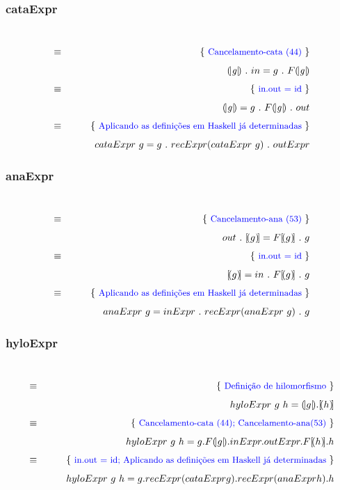 \documentclass[a4paper]{article}
\newcommand{\Varid}[1]{\mathit{#1}}
\def\ana#1{\mathopen{[\!(}#1\mathclose{)\!]}}
\begin{document}
\vspace{0.5cm}

\subsubsection*{cataExpr}

\begin{eqnarray*}
\start
\just\equiv{\textcolor{blue}{Cancelamento-cata\ (44)}}
%
  \ensuremath{\cata{\Varid{g}}}\ .\ in = g\ .\ F\ensuremath{\cata{\Varid{g}}}
%
\just\equiv{\textcolor{blue}{in.out = id}}
%
  \ensuremath{\cata{\Varid{g}}}  = g\ .\ F\ensuremath{\cata{\Varid{g}}}\ .\ out
%
\just\equiv{\textcolor{blue}{Aplicando as definições em Haskell já determinadas}}
%
  cataExpr\ g = g\ .\ recExpr(cataExpr\ g)\ .\ outExpr
%
\end{eqnarray*}

\vspace{0.5cm}

\subsubsection*{anaExpr}

\begin{eqnarray*}
\start
\just\equiv{\textcolor{blue}{Cancelamento-ana\ (53)}}
%
  out\ .\ \ana{g} = F\ana{g}\ .\ g
%
\just\equiv{\textcolor{blue}{in.out = id}}
%
  \ana{g} = in\ .\ F\ana{g}\ .\ g
%
\just\equiv{\textcolor{blue}{Aplicando as definições em Haskell já determinadas}}
%
  anaExpr\ g = inExpr\ .\ recExpr(anaExpr\ g)\ .\ g
%
\end{eqnarray*}

\vspace{0.5cm}

\subsubsection*{hyloExpr}

\begin{eqnarray*}
\start
\just\equiv{\textcolor{blue}{Definição de hilomorfismo}}
%
  hyloExpr\ g\ h = \cata{g}.\ana{h}
%
\just\equiv{\textcolor{blue}{Cancelamento-cata (44); Cancelamento-ana(53)}}
%
  hyloExpr\ g\ h = g.F\cata{g}.inExpr.outExpr.F\ana{h}.h
%
\just\equiv{\textcolor{blue}{in.out = id; Aplicando as definições em Haskell já determinadas}}
%
  hyloExpr\ g\ h = g.recExpr(cataExpr g).recExpr(anaExpr h).h
%
\end{eqnarray*}

\vspace{0.5cm}
\end{document}
